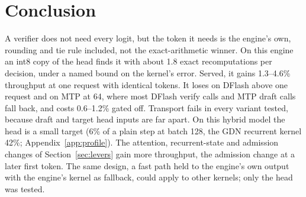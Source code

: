 \section{Conclusion}\label{sec:conclusion}
A verifier does not need every logit, but the token it needs is the engine's own, rounding and tie rule included, not the exact-arithmetic winner. On this engine an int8 copy of the head finds it with about 1.8 exact recomputations per decision, under a named bound on the kernel's error. Served, it gains 1.3--4.6\% throughput at one request with identical tokens. It loses on DFlash above one request and on MTP at 64, where most DFlash verify calls and MTP draft calls fall back, and costs 0.6--1.2\% gated off. Transport fails in every variant tested, because draft and target head inputs are far apart. On this hybrid model the head is a small target (6\% of a plain step at batch 128, the GDN recurrent kernel 42\%; Appendix~\ref{app:profile}). The attention, recurrent-state and admission changes of Section~\ref{sec:levers} gain more throughput, the admission change at a later first token. The same design, a fast path held to the engine's own output with the engine's kernel as fallback, could apply to other kernels; only the head was tested.
